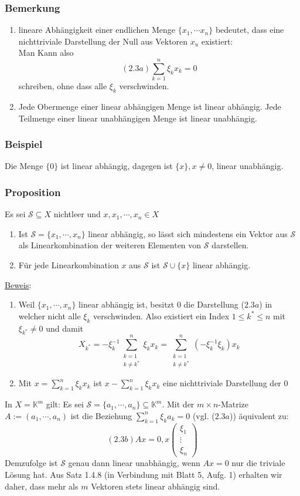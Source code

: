 \subsubsection{Bemerkung}
\renewcommand{\labelenumi}{(\arabic{enumi})}
\begin{enumerate}
\item lineare Abhängigkeit einer endlichen Menge $\{x_1,\cdots x_n\}$ bedeutet, dass eine nichttriviale Darstellung der Null aus Vektoren $x_u$ existiert:\\
Man Kann also
\[(2.3a) \sum_{k=1}^n \xi _kx_k = 0\]
schreiben, ohne dass alle $\xi _k$ verschwinden.
\item Jede Obermenge einer linear abhängigen Menge ist linear abhängig.  Jede Teilmenge einer linear unabhängigen Menge ist linear unabhängig.
\end{enumerate}
\subsubsection{Beispiel}
Die Menge $\{0\}$ ist linear abhängig, dagegen ist $\{x\},x\not= 0$, linear unabhängig.
\subsubsection{Proposition}
Es sei $\mathcal{S}\subseteq X$ nichtleer und $x,x_1,\cdots ,x_n \in X$
\renewcommand{\labelenumi}{(\alph{enumi})}
\begin{enumerate}
\item Ist $\mathcal{S}=\{x_1, \cdots ,x_n\}$ linear abhängig, so lässt sich mindestens ein Vektor aus $\mathcal{S}$ als Linearkombination der weiteren Elementen von $\mathcal{S}$ darstellen.
\item Für jede Linearkombination $x$ aus $\mathcal{S}$ ist $\mathcal{S}\cup \{x\}$ linear abhängig.
\end{enumerate}
\underline{Beweis}:
\begin{enumerate}
\item Weil $\{x_1,\cdots ,x_n\}$ linear abhängig ist, besitzt $0$ die Darstellung ($2.3a$) in welcher nicht alle $\xi _k$ verschwinden.  Also existiert ein Index $1\leq k^*\leq n$ mit $\xi _{k^*} \not= 0$ und damit
\[X_{k^*} = -\xi _k^{-1} \sum_{\substack{k=1\\ k\not=k^*}}^n \xi _k x_k =\sum_{\substack{k=1\\ k\not=k^*}}^n (-\xi _k^{-1} \xi _k) x_k\]
\item Mit $x=\sum_{k=1}^n\xi _k x_k$ ist $x - \sum_{k=1}^n \xi _k x_k$ eine nichttriviale Darstellung der $0$
\end{enumerate}
In $X=\mathbb{K}^m$ gilt: Es sei $\mathcal{S}=\{a_1,\cdots ,a_n\}\subseteq \mathbb{K}^m$.  Mit der $m\times n$-Matrize $A:= (a_1,\cdots ,a_n)$ ist die Beziehung $\sum^n_{k=1} \xi _k a_k =0$ (vgl. ($2.3a$)) äquivalent zu:
\[ (2.3b) Ax=0, x\begin{pmatrix}\xi _1 \\ \vdots \\ \xi_n\end{pmatrix}\]
Demzufolge ist $\mathcal{S}$ genau dann linear unabhängig, wenn $Ax=0$ nur die triviale Lösung hat.  Aus Satz 1.4.8 (in Verbindung mit Blatt 5, Aufg. 1) erhalten wir daher, dass mehr als $m$ Vektoren stets linear abhängig sind.

